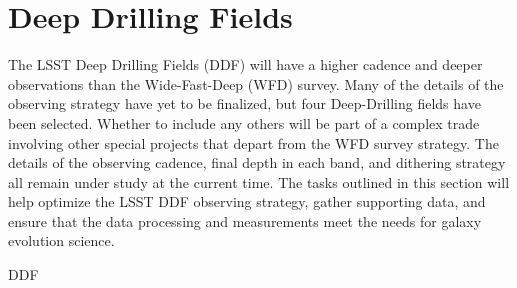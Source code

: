 \section{Deep Drilling Fields}\label{sec:tasks:ddf}  

{\justify
The LSST Deep Drilling Fields (DDF) will have a higher cadence and deeper observations than the Wide-Fast-Deep (WFD) survey.
Many of the details of the observing strategy have yet to be finalized, but four Deep-Drilling fields have been selected.
Whether to include any others will be part of a complex trade involving other special projects that depart from the WFD survey strategy. The details of the observing cadence, final depth in each band, and dithering strategy all remain  under study at the current time. 
The tasks outlined in this section will help optimize the LSST DDF
observing strategy, gather supporting data, and ensure that the data processing and measurements meet the needs for galaxy evolution science.

\begin{tasklist}{DDF}


\end{tasklist}}
